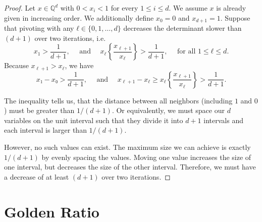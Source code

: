 \documentclass[english,version-2020-11]{uzl-thesis}
\begin{document}
\begin{proof}
  Let $x ∈ ℚ^d$ with $0 < x_i < 1$ for every $1 ≤ i ≤ d$.
  We assume $x$ is already given in increasing order.
  We additionally define $x_0 = 0$ and $x_{d+1} = 1$.
  Suppose that pivoting with any $ℓ ∈ \{0, 1, \dots, d\}$
  decreases the determinant slower than $(d+1)$ over two iterations,
  i.e.
  \[
    x_1 > \frac{1}{d+1},
    \quad \text{ and } \quad
    x_\ell \left\{\frac{x_{\ell+1}}{x_\ell}\right\} > \frac{1}{d+1}, \quad \text{ for all } 1 ≤ ℓ ≤ d.
  \]
  Because $x_{\ell+1} > x_\ell$, we have
  \[
    x₁ - x₀ > \frac{1}{d+1},
    \quad \text{ and } \quad
    x_{\ell+1} - x_\ell ≥ x_\ell \left\{\frac{x_{\ell+1}}{x_\ell}\right\} > \frac{1}{d+1}.
  \]

  The inequality tells us, that the distance between all neighbors
  (including $1$ and $0$) must be greater than $1/(d+1)$.
  Or equivalently, we must space our $d$ variables on the unit interval such that they
  divide it into $d+1$ intervals and each interval is larger than $1/(d+1)$.

  {\begin{center}
  \end{center}}

  However, no such values can exist.
  The maximum size we can achieve is exactly $1/(d+1)$ by evenly
  spacing the values.
  Moving one value increases the size of one interval, but decreases the size
  of the other interval.
  Therefore, we must have a decrease of at least $(d+1)$ over two iterations.
\end{proof}

\section{Golden Ratio}
\end{document}
